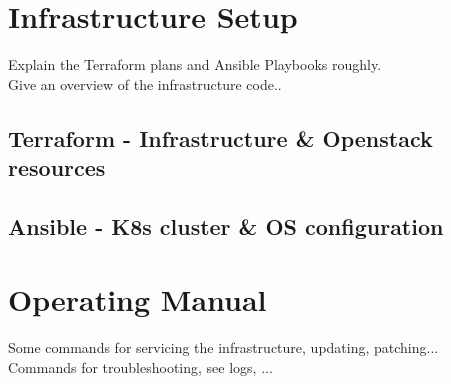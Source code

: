 \section{Infrastructure Setup}
Explain the Terraform plans and Ansible Playbooks roughly. \\

\noindent Give an overview of the infrastructure code..

\subsection{Terraform - Infrastructure \& Openstack resources}

\subsection{Ansible - K8s cluster \& OS configuration}

\section{Operating Manual}
Some commands for servicing the infrastructure, updating, patching... \\

\noindent Commands for troubleshooting, see logs, ...
